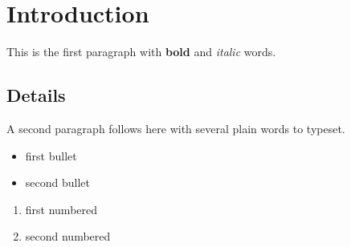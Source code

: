 \documentclass{article}
\begin{document}
\section{Introduction}
This is the first paragraph with \textbf{bold} and \emph{italic} words.
\subsection{Details}
A second paragraph follows here with several plain words to typeset.
\begin{itemize}
\item first bullet
\item second bullet
\end{itemize}
\begin{enumerate}
\item first numbered
\item second numbered
\end{enumerate}
\end{document}
